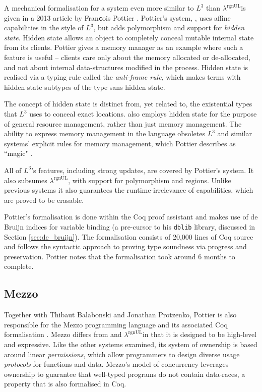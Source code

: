 \documentclass[]{unswthesis}
\newcommand{\rgnUL}{$\lambda^\text{rgnUL}$\text{ }}
\newcommand{\SSPHS}{\text{SSPHS }}
\let\c\texttt
\begin{document}
A mechanical formalisation for a system even more similar to $L^3$ than \rgnUL is given in a 2013 article by Fran\c{c}ois Pottier \cite{pottier13}. Pottier's system, \SSPHS, uses affine capabilities in the style of $L^3$, but adds polymorphism and support for \textit{hidden state}. Hidden state allows an object to completely conceal mutable internal state from its clients. Pottier gives a memory manager as an example where such a feature is useful -- clients care only about the memory allocated or de-allocated, and not about internal data-structures modified in the process. Hidden state is realised via a typing rule called the \textit{anti-frame rule}, which makes terms with hidden state subtypes of the type sans hidden state.

The concept of hidden state is distinct from, yet related to, the existential types that $L^3$ uses to conceal exact locations. \SSPHS also employs hidden state for the purpose of general resource management, rather than just memory management. The ability to express memory management in the language obsoletes $L^3$ and similar systems' explicit rules for memory management, which Pottier describes as ``magic" \cite{pottier13}.

All of $L^3$'s features, including strong updates, are covered by Pottier's system. It also subsumes \rgnUL, with support for polymorphism and regions. Unlike previous systems it also guarantees the runtime-irrelevance of capabilities, which are proved to be erasable.

Pottier's formalisation is done within the Coq proof assistant and makes use of de Bruijn indices for variable binding (a pre-cursor to his \c{dblib} library, discussed in Section \ref{sec:de_bruijn}). The formalisation consists of 20,000 lines of Coq source and follows the syntactic approach to proving type soundness via progress and preservation. Pottier notes that the formalisation took around 6 months to complete.

\subsection{Mezzo}

Together with Thibaut Balabonski and Jonathan Protzenko, Pottier is also responsible for the Mezzo programming language and its associated Coq formalisation \cite{mezzo14}. Mezzo differs from \SSPHS and \rgnUL in that it is designed to be high-level and expressive. Like the other systems examined, its system of ownership is based around linear \textit{permissions}, which allow programmers to design diverse usage \textit{protocols} for functions and data. Mezzo's model of concurrency leverages ownership to guarantee that well-typed programs do not contain data-races, a property that is also formalised in Coq.
\end{document}
